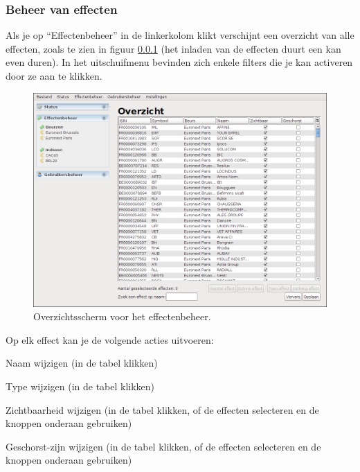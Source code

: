 \subsubsection{Beheer van effecten}
\label{sec:handl:admin:effecten}

Als je op ``Effectenbeheer'' in de linkerkolom klikt verschijnt een overzicht van alle effecten, zoals te zien in figuur \ref{sec:handl:admin:effecten} (het inladen van de effecten duurt een kan even duren).
In het uitschuifmenu bevinden zich enkele filters die je kan activeren door ze aan te klikken.

\begin{figure}[h!]
	\centering
		\includegraphics[width=\textwidth]{images/handleiding/administratie/effecten-overzicht}
	\caption{Overzichtsscherm voor het effectenbeheer.}
		\label{fig:handl:admin:effecten-overzicht}
\end{figure}

Op elk effect kan je de volgende acties uitvoeren:

\begin{itemize_compact}
\item{Naam wijzigen (in de tabel klikken)}
\item{Type wijzigen (in de tabel klikken)}
\item{Zichtbaarheid wijzigen (in de tabel klikken, of de effecten selecteren en de knoppen onderaan gebruiken)}
\item{Geschorst-zijn wijzigen (in de tabel klikken, of de effecten selecteren en de knoppen onderaan gebruiken)}
\end{itemize_compact}

